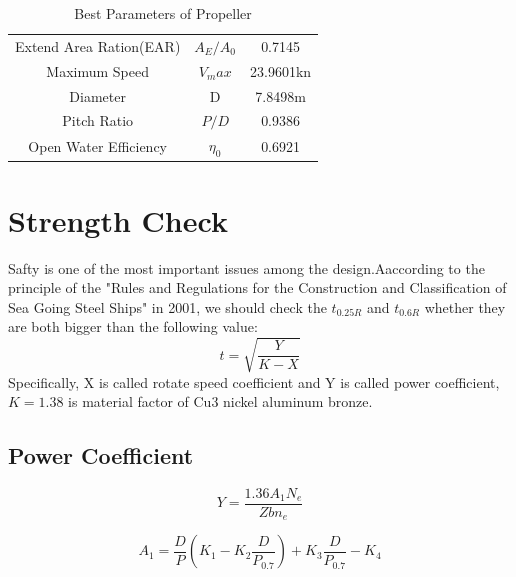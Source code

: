 \documentclass[a4paper,UTF8]{article}
\begin{document}
\begin{table}[!htbp]
	\centering
	\begin{tabular}{ccc}
		\hline
		Extend Area Ration(EAR)&$A_E/A_0$&0.7145\\
		Maximum Speed&$V_max$&23.9601kn\\
		Diameter&D&7.8498m\\
		Pitch Ratio&$P/D$&0.9386 \\ 
		Open Water Efficiency&$\eta_0$&0.6921 \\
		\hline
	\end{tabular}	
	\caption{Best Parameters of Propeller}
	\label{tab:cavicheck}
\end{table}

\section{Strength Check}
Safty is one of the most important issues among the design.Aaccording to the principle of the "Rules and Regulations for the Construction and Classification of Sea Going Steel Ships" in 2001, we should check the $t_{0.25R}$ and $t_{0.6R}$ whether they are both bigger than the following value:
\begin{equation}
	t=\sqrt{\frac{Y}{K-X}}
\end{equation}
Specifically, X is called rotate speed coefficient and Y is called power coefficient, $K=1.38$ is material factor of Cu3 nickel aluminum bronze.

\subsection{Power Coefficient}
\begin{equation}
		Y=\frac{1.36A_1N_e}{Zbn_e}
\end{equation}

\begin{equation}
	A_1=\frac{D}{P}(K_1-K_2\frac{D}{P_{0.7}})+K_3\frac{D}{P_{0.7}}-K_4
\end{equation}
\end{document}
